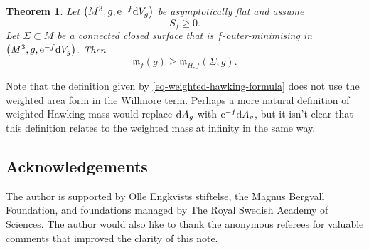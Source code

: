 \documentclass[pdftex]{sigma}
\numberwithin{equation}{section}
\newtheorem{Theorem}{Theorem}[section]
\theoremstyle{definition}
\begin{document}
\begin{Theorem}\label{thm-weighted-hawking-bound}
	Let $\bigl(M^3,g,{\rm e}^{-f}{\rm d}V_g\bigr)$ be asymptotically flat and assume
	\[
	S_f \ge 0.
	\]
	Let $\Sigma\subset M$ be a connected closed surface that is $f$-outer-minimising in $\bigl(M^3,g,{\rm e}^{-f}{\rm d}V_g\bigr)$.
	Then
	\begin{equation*}%
		\mathfrak{m}_f(g) \ge \mathfrak{m}_{H,f}(\Sigma;g).
	\end{equation*}
\end{Theorem}
Note that the definition given by \eqref{eq-weighted-hawking-formula} does not use the weighted area form in the Willmore term. Perhaps a more natural definition of weighted Hawking mass would replace ${\rm d}A_g$ with ${\rm e}^{-f}{\rm d}A_g$, but it isn't clear that this definition relates to the weighted mass at infinity in the same way.

\subsection*{Acknowledgements}

The author is supported by Olle Engkvists stiftelse, the Magnus Bergvall Foundation, and foundations managed by The Royal Swedish Academy of Sciences. The author would also like to thank the anonymous referees for valuable comments that improved the clarity of this note.


%
%
\end{document}
